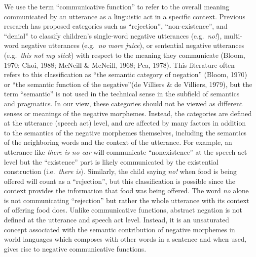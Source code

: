 \documentclass[
  man,floatsintext]{apa6}
\begin{document}
We use the term ``communicative function'' to refer to the overall meaning communicated by an utterance as a linguistic act in a specific context. Previous research has proposed categories such as ``rejection'', ``non-existence'', and ``denial'' to classify children's single-word negative utterances (e.g.~\emph{no!}), multi-word negative utterances (e.g.~\emph{no more juice}), or sentential negative utterances (e.g.~\emph{this not my stick}) with respect to the meaning they communicate (Bloom, 1970; Choi, 1988; McNeill \& McNeill, 1968; Pea, 1978). This literature often refers to this classification as ``the semantic category of negation'' (Bloom, 1970) or ``the semantic function of the negative''(de Villiers \& de Villiers, 1979), but the term ``semantic'' is not used in the technical sense in the subfield of semantics and pragmatics. In our view, these categories should not be viewed as different senses or meanings of the negative morphemes. Instead, the categories are defined at the utterance (speech act) level, and are affected by many factors in addition to the semantics of the negative morphemes themselves, including the semantics of the neighboring words and the context of the utterance. For example, an utterance like \emph{there is no car} will communicate ``nonexistence'' at the speech act level but the ``existence'' part is likely communicated by the existential construction (i.e.~\emph{there is}). Similarly, the child saying \emph{no!} when food is being offered will count as a ``rejection'', but this classification is possible since the context provides the information that food was being offered. The word \emph{no} alone is not communicating ``rejection'' but rather the whole utterance with its context of offering food does. Unlike communicative functions, abstract negation is not defined at the utterance and speech act level. Instead, it is an unsaturated concept associated with the semantic contribution of negative morphemes in world languages which composes with other words in a sentence and when used, gives rise to negative communicative functions.
\end{document}

